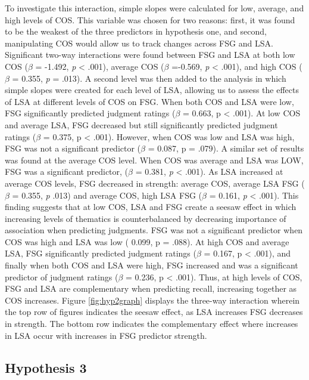 \documentclass[english,man]{apa6}
\theoremstyle{definition}
\theoremstyle{definition}
\theoremstyle{remark}
\begin{document}
To investigate this interaction, simple slopes were calculated for low,
average, and high levels of COS. This variable was chosen for two
reasons: first, it was found to be the weakest of the three predictors
in hypothesis one, and second, manipulating COS would allow us to track
changes across FSG and LSA. Significant two-way interactions were found
between FSG and LSA at both low COS (\(\beta\) = -1.492, \emph{p}
\textless{} .001), average COS (\(\beta\) =-0.569, \emph{p} \textless{}
.001), and high COS (\(\beta\) = 0.355, \emph{p} = .013). A second level
was then added to the analysis in which simple slopes were created for
each level of LSA, allowing us to assess the effects of LSA at different
levels of COS on FSG. When both COS and LSA were low, FSG significantly
predicted judgment ratings (\(\beta\) = 0.663, p \textless{} .001). At
low COS and average LSA, FSG decreased but still significantly predicted
judgment ratings (\(\beta\) = 0.375, p \textless{} .001). However, when
COS was low and LSA was high, FSG was not a significant predictor
(\(\beta\) = 0.087, p = .079). A similar set of results was found at the
average COS level. When COS was average and LSA was LOW, FSG was a
significant predictor, (\(\beta\) = 0.381, \emph{p} \textless{} .001).
As LSA increased at average COS levels, FSG decreased in strength:
average COS, average LSA FSG (\(\beta\) = 0.355, \emph{p} .013) and
average COS, high LSA FSG (\(\beta\) = 0.161, \emph{p} \textless{}
.001). This finding suggests that at low COS, LSA and FSG create a
seesaw effect in which increasing levels of thematics is counterbalanced
by decreasing importance of association when predicting judgments. FSG
was not a significant predictor when COS was high and LSA was low (
0.099, p = .088). At high COS and average LSA, FSG significantly
predicted judgment ratings (\(\beta\) = 0.167, p \textless{} .001), and
finally when both COS and LSA were high, FSG increased and was a
significant predictor of judgment ratings (\(\beta\) = 0.236, p
\textless{} .001). Thus, at high levels of COS, FSG and LSA are
complementary when predicting recall, increasing together as COS
increases. Figure \ref{fig:hyp2graph} displays the three-way interaction
wherein the top row of figures indicates the seesaw effect, as LSA
increases FSG decreases in strength. The bottom row indicates the
complementary effect where increases in LSA occur with increases in FSG
predictor strength.

\subsection{Hypothesis 3}\label{hypothesis-3}
\end{document}
